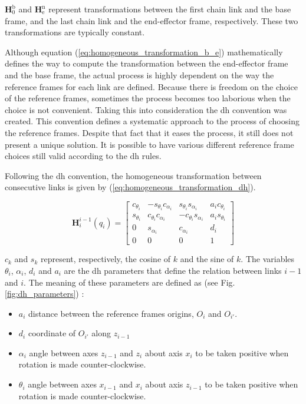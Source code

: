 $\boldsymbol{H}^{\text{b}}_{\text{0}}$ and $\boldsymbol{H}^{\text{n}}_{\text{e}}$ represent transformations between the first chain link and the base frame, and the last chain link and the end-effector frame, respectively. These two transformations are typically constant.

Although equation (\ref{eq:homogeneous_transformation_b_e}) mathematically defines the way to compute the transformation between the end-effector frame and the base frame, the actual process is highly dependent on the way the reference frames for each link are defined. Because there is freedom on the choice of the reference frames, sometimes the process becomes too laborious when the choice is not convenient. Taking this into consideration the \gls{dh} convention was created. This convention defines a systematic approach to the process of choosing the reference frames. Despite that fact that it eases the process, it still does not present a unique solution. It is possible to have various different reference frame choices still valid according to the \gls{dh} rules.

Following the \gls{dh} convention, the homogeneous transformation between consecutive links is given by (\ref{eq:homogeneous_transformation_dh}).

\begin{equation}
    \label{eq:homogeneous_transformation_dh}
    \boldsymbol{H}^{i-1}_{i}(q_i) = \begin{bmatrix}
        c_{\theta_i} & -s_{\theta_i}c_{\alpha_i} & s_{\theta_i}s_{\alpha_i} & a_{i}c_{\theta_i}\\
        s_{\theta_i} & c_{\theta_i}c_{\alpha_i} & -c_{\theta_i}s_{\alpha_i} & a_{i}s_{\theta_i}\\
        0 & s_{\alpha_i} & c_{\alpha_i} & d_{i}\\
        0 & 0 & 0 & 1
    \end{bmatrix}
\end{equation}

$c_k$ and $s_k$ represent, respectively, the cosine of $k$ and the sine of $k$. The variables $\theta_i$, $\alpha_i$, $d_i$ and $a_i$ are the \gls{dh} parameters that define the relation between links $i-1$ and $i$. The meaning of these parameters are defined as (see Fig. \ref{fig:dh_parameters}) \cite{Siciliano2009_robotics_modelling_planning_control}:

\begin{itemize}
    \item $a_i$ distance between the reference frames origins, $O_i$ and $O_{i'}$.
    \item $d_i$ coordinate of $O_{i'}$ along $z_{i-1}$
    \item $\alpha_i$ angle between axes $z_{i-1}$ and $z_i$ about axis $x_i$ to be taken positive when rotation is made counter-clockwise.
    \item $\theta_i$ angle between axes $x_{i-1}$ and $x_i$ about axis $z_{i-1}$ to be taken positive when rotation is made counter-clockwise.
\end{itemize}

